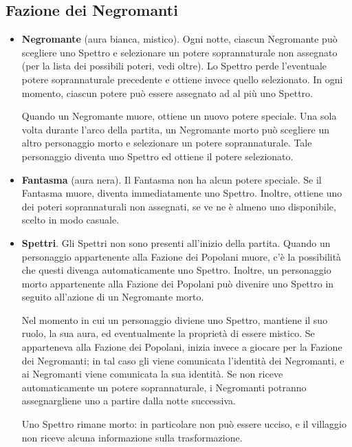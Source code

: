 \documentclass[a4paper,10pt]{article}
\begin{document}
\subsection*{Fazione dei Negromanti}
\label{negromanti}

\begin{itemize}

	\item {\bf Negromante} (aura bianca, mistico). Ogni notte, ciascun Negromante può scegliere uno Spettro e selezionare un potere soprannaturale non assegnato (per la lista dei possibili poteri, vedi oltre). Lo Spettro perde l'eventuale potere soprannaturale precedente e ottiene invece quello selezionato. In ogni momento, ciascun potere può essere assegnato ad al più uno Spettro.
	
	Quando un Negromante muore, ottiene un nuovo potere speciale. Una sola volta durante l'arco della partita, un Negromante morto può scegliere un altro personaggio morto e selezionare un potere soprannaturale. Tale personaggio diventa uno Spettro ed ottiene il potere selezionato.
 
	\item {\bf Fantasma} (aura nera). Il Fantasma non ha alcun potere speciale. Se il Fantasma muore, diventa immediatamente uno Spettro. Inoltre, ottiene uno dei poteri soprannaturali non assegnati, se ve ne è almeno uno disponibile, scelto in modo casuale.

	\item {\bf Spettri}. Gli Spettri non sono presenti all'inizio della partita. Quando un personaggio appartenente alla Fazione dei Popolani muore, c'è la possibilità che questi divenga automaticamente uno Spettro. Inoltre, un personaggio morto appartenente alla Fazione dei Popolani può divenire uno Spettro in seguito all'azione di un Negromante morto.
 	
 	Nel momento in cui un personaggio diviene uno Spettro, mantiene il suo ruolo, la sua aura, ed eventualmente la proprietà di essere mistico. Se apparteneva alla Fazione dei Popolani, inizia invece a giocare per la Fazione dei Negromanti; in tal caso gli viene comunicata l'identità dei Negromanti, e ai Negromanti viene comunicata la sua identità. Se non riceve automaticamente un potere soprannaturale, i Negromanti potranno assegnargliene uno a partire dalla notte successiva.
 	
	Uno Spettro rimane morto: in particolare non può essere ucciso, e il villaggio non riceve alcuna informazione sulla trasformazione.
 
\end{itemize}
\end{document}
